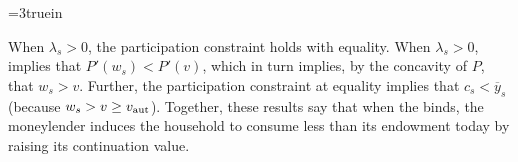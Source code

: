 

\centerline{\epsfxsize=3truein}
\caption{Determination of consumption and promised utility ($c, w$).
Higher realizations of
$\overline y_s$ are associated with higher indifference curves $u(c) + \beta w =
u(\overline y_s) + \beta v_{\rm aut}$.  For a given $v$, there is a threshold level
$\bar y(v)$ above which the participation constraint is binding and below which the
moneylender awards a constant level of consumption, as a function of $v$, and maintains the
same promised value $w =v$.  The cutoff level $\bar y(v)$ is determined by the
indifference curve going through the intersection of a horizontal line at level $v$
with the ``expansion path'' $u'(c)P'(w)=-1$.}
\endfigure

\newpage \noindent

{}
\smallskip

\noindent
When $\lambda_s>0$, the participation constraint  holds
with equality.   When $\lambda_s > 0$,
 implies
that $P'(w_s) < P'(v)$, which in turn implies, by the concavity
of $P$, that $w_s > v$.  Further, the participation constraint
at equality implies that $c_s < \overline y_s$
(because $w_s > v \geq v_{\rm aut}$).
Together, these results say that when the   binds, the moneylender induces the household to
consume less than its endowment today by raising its
continuation value.

